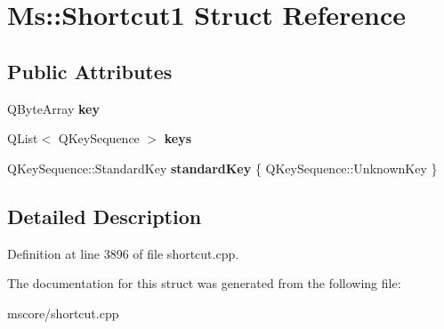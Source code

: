 \hypertarget{struct_ms_1_1_shortcut1}{}\section{Ms\+:\+:Shortcut1 Struct Reference}
\label{struct_ms_1_1_shortcut1}
\subsection*{Public Attributes}
\begin{DoxyCompactItemize}
\item 
\mbox{\label{struct_ms_1_1_shortcut1_aa13569420d5db972d3d98c54e6c59f25}} 
Q\+Byte\+Array {\bfseries key}
\item 
\mbox{\label{struct_ms_1_1_shortcut1_a770f54082a2a3bea86a88aae3d9e7ad7}} 
Q\+List$<$ Q\+Key\+Sequence $>$ {\bfseries keys}
\item 
\mbox{\label{struct_ms_1_1_shortcut1_acd4f3290ca4a4d6e3935b3b59187b5e2}} 
Q\+Key\+Sequence\+::\+Standard\+Key {\bfseries standard\+Key} \{ Q\+Key\+Sequence\+::\+Unknown\+Key \}
\end{DoxyCompactItemize}


\subsection{Detailed Description}


Definition at line 3896 of file shortcut.\+cpp.



The documentation for this struct was generated from the following file\+:\begin{DoxyCompactItemize}
\item 
mscore/shortcut.\+cpp\end{DoxyCompactItemize}
